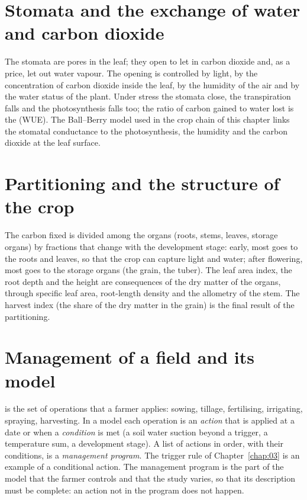 \section{Stomata and the exchange of water and carbon dioxide}
The stomata are pores in the leaf; they open to let in carbon dioxide and, as a price, let out water vapour. The opening is controlled by light, by the concentration of carbon dioxide inside the leaf, by the humidity of the air and by the water status of the plant. Under stress the stomata close, the transpiration falls and the photosynthesis falls too; the ratio of carbon gained to water lost is the  (WUE). The Ball--Berry model used in the crop chain of this chapter links the stomatal conductance to the photosynthesis, the humidity and the carbon dioxide at the leaf surface.

\section{Partitioning and the structure of the crop}
The carbon fixed is divided among the organs (roots, stems, leaves, storage organs) by  fractions that change with the development stage: early, most goes to the roots and leaves, so that the crop can capture light and water; after flowering, most goes to the storage organs (the grain, the tuber). The leaf area index, the root depth and the height are consequences of the dry matter of the organs, through specific leaf area, root-length density and the allometry of the stem. The harvest index (the share of the dry matter in the grain) is the final result of the partitioning.

\section{Management of a field and its model}
 is the set of operations that a farmer applies: sowing, tillage, fertilising, irrigating, spraying, harvesting. In a model each operation is an \emph{action} that is applied at a date or when a \emph{condition} is met (a soil water suction beyond a trigger, a temperature sum, a development stage). A list of actions in order, with their conditions, is a \emph{management program}. The trigger rule of Chapter~\ref{chap:03} is an example of a conditional action. The management program is the part of the model that the farmer controls and that the study varies, so that its description must be complete: an action not in the program does not happen.
